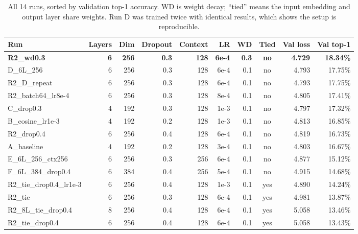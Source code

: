 \documentclass[11pt,a4paper]{article}
\begin{document}
\begin{table}[H]
\centering
\small
\begin{tabular}{lrrrrrrcrr}
\toprule
Run & Layers & Dim & Dropout & Context & LR & WD & Tied & Val loss & Val top-1 \\
\midrule
\textbf{R2\_wd0.3} & \textbf{6} & \textbf{256} & \textbf{0.3} & \textbf{128} & \textbf{6e-4} & \textbf{0.3} & \textbf{no} & \textbf{4.729} & \textbf{18.34\%} \\
D\_6L\_256 & 6 & 256 & 0.3 & 128 & 6e-4 & 0.1 & no & 4.793 & 17.75\% \\
R2\_D\_repeat & 6 & 256 & 0.3 & 128 & 6e-4 & 0.1 & no & 4.793 & 17.75\% \\
R2\_batch64\_lr8e-4 & 6 & 256 & 0.3 & 128 & 8e-4 & 0.1 & no & 4.805 & 17.41\% \\
C\_drop0.3 & 4 & 192 & 0.3 & 128 & 1e-3 & 0.1 & no & 4.797 & 17.32\% \\
B\_cosine\_lr1e-3 & 4 & 192 & 0.2 & 128 & 1e-3 & 0.1 & no & 4.813 & 16.85\% \\
R2\_drop0.4 & 6 & 256 & 0.4 & 128 & 6e-4 & 0.1 & no & 4.819 & 16.73\% \\
A\_baseline & 4 & 192 & 0.2 & 128 & 3e-4 & 0.1 & no & 4.803 & 16.67\% \\
E\_6L\_256\_ctx256 & 6 & 256 & 0.3 & 256 & 6e-4 & 0.1 & no & 4.877 & 15.12\% \\
F\_6L\_384\_drop0.4 & 6 & 384 & 0.4 & 256 & 5e-4 & 0.1 & no & 4.915 & 14.68\% \\
R2\_tie\_drop0.4\_lr1e-3 & 6 & 256 & 0.4 & 128 & 1e-3 & 0.1 & yes & 4.890 & 14.24\% \\
R2\_tie & 6 & 256 & 0.3 & 128 & 6e-4 & 0.1 & yes & 4.981 & 13.87\% \\
R2\_8L\_tie\_drop0.4 & 8 & 256 & 0.4 & 128 & 6e-4 & 0.1 & yes & 5.058 & 13.46\% \\
R2\_tie\_drop0.4 & 6 & 256 & 0.4 & 128 & 6e-4 & 0.1 & yes & 5.058 & 13.43\% \\
\bottomrule
\end{tabular}
\caption{All 14 runs, sorted by validation top-1 accuracy. WD is weight decay; ``tied'' means the input embedding and output layer share weights. Run D was trained twice with identical results, which shows the setup is reproducible.}
\end{table}
\end{document}
